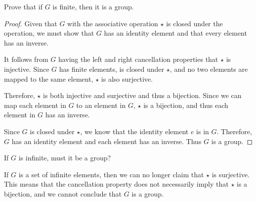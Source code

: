 \documentclass{article}
\theoremstyle{plain} %
\theoremstyle{definition} %
\begin{document}
\noindent{} Prove that if $G$ is finite, then it is a group.
\begin{proof}
    Given that $G$ with the associative operation $\star$ is closed under the operation,
    we must show that $G$ has an identity element and that every element has an inverse.

    It follows from $G$ having the left and right cancellation properties that $\star$ is injective.
    Since $G$ has finite elements, is closed under $\star$, and no two elements are mapped to the same element, $\star$ is also surjective.
    
    Therefore, $\star$ is both injective and surjective and thus a bijection.
    Since we can map each element in $G$ to an element in $G$, $\star$ is a bijection,
    and thus each element in $G$ has an inverse.

    Since $G$ is closed under $\star$, we know that the identity element $e$ is in $G$.
    Therefore, $G$ has an identity element and each element has an inverse.
    Thus $G$ is a group.

\end{proof}

\noindent{} If $G$ is infinite, must it be a group?

If $G$ is a set of infinite elements, then we can no longer claim that
$\star$ is surjective. This means that the cancellation property does not 
necessarily imply that $\star$ is a bijection, and we cannot conclude that $G$ is a group.
\end{document}
